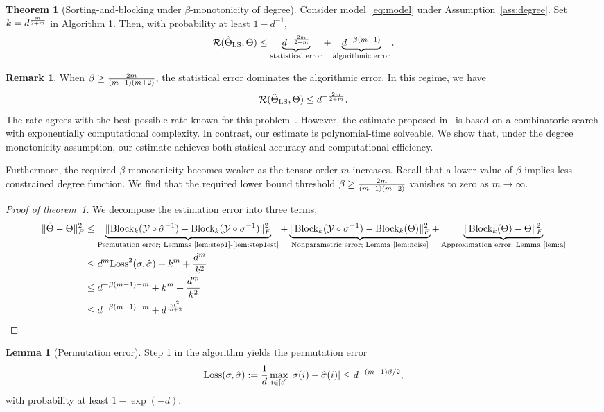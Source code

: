 \documentclass[10pt]{article}
\newcommand*{\KeepStyleUnderBrace}[1]{%
  \mathop{%
    \mathchoice
    {\underbrace{\displaystyle#1}}%
    {\underbrace{\textstyle#1}}%
    {\underbrace{\scriptstyle#1}}%
    {\underbrace{\scriptscriptstyle#1}}%
  }\limits
}
\theoremstyle{definition}
\newtheorem{thm}{Theorem}[section]
\newtheorem{lem}{Lemma}
\theoremstyle{definition}
\newtheorem{rmk}{Remark}
\theoremstyle{definition}
\begin{document}
\begin{thm}[Sorting-and-blocking under $\beta$-monotonicity of degree]\label{thm:main}
Consider model~\ref{eq:model} under Assumption~\ref{ass:degree}. Set $k=d^{m\over 2+m}$ in Algorithm 1. Then, with probability at least $1-d^{-1}$, 
\[
\tR(\hat \Theta_{\text{LS}}, \Theta) \leq \KeepStyleUnderBrace{d^{-{2m\over 2+m}}}_{\text{statistical error}}+\KeepStyleUnderBrace{d^{-{\beta(m-1)}}}_{\text{algorithmic error}}. 
\]
\end{thm}

\begin{rmk}
When $\beta\geq {2m\over (m-1)(m+2)}$, the statistical error dominates the algorithmic error.  In this regime, we have 
\[
\mathcal{R}(\hat \Theta_{\text{LS}}, \Theta) \leq d^{-{2m\over 2+m}}.
\]
The rate agrees with the best possible rate known for this problem~\cite{balasubramanian2021nonparametric}. However, the estimate proposed in~\cite{balasubramanian2021nonparametric} is based on a combinatoric search with exponentially computational complexity. In contrast, our estimate is polynomial-time solveable. We show that, under the degree monotonicity assumption, our estimate achieves both statical accuracy and computational efficiency. 

Furthermore, the required $\beta$-monotonicity becomes weaker as the tensor order $m$ increases. Recall that a lower value of $\beta$ implies less constrained degree function. We find that the required lower bound threshold $\beta\geq {2m\over (m-1)(m+2)}$ vanishes to zero as $m\to \infty$. 
\end{rmk}

\begin{proof}[Proof of theorem~\ref{thm:main}] 
We decompose the estimation error into three terms, 
\begin{align}
\FnormSize{}{\hat \Theta -\Theta}^2&\leq \KeepStyleUnderBrace{\FnormSize{}{\text{Block}_k(\tY\circ \hat \sigma^{-1}) - \text{Block}_k(\tY\circ \sigma^{-1})}^2}_{\text{Permutation error; Lemmas~\ref{lem:step1}-\ref{lem:step1est}}}+\KeepStyleUnderBrace{\FnormSize{}{\text{Block}_k(\tY\circ \sigma^{-1})-\text{Block}_k(\Theta)}^2}_{\text{Nonparametric error; Lemma~\ref{lem:noise}}}+\KeepStyleUnderBrace{\FnormSize{}{\text{Block}_k(\Theta)-\Theta}^2}_{\text{Approximation error; Lemma~\ref{lem:a}}}\\
&\leq  d^m \text{Loss}^2(\sigma,\hat \sigma) + k^m+{d^m\over k^2}\\
&\leq d^{-\beta(m-1)+m}+ k^m+ {d^m\over k^2}\\
&\leq d^{-\beta(m-1)+m}+d^{m^2\over m+2}
\end{align}
\end{proof}
\begin{lem}[Permutation error]\label{lem:step1}Step 1 in the algorithm yields the permutation error
\[
\text{Loss}(\sigma, \hat \sigma):={1\over d}\max_{i\in[d]}|\sigma(i)-  \hat \sigma(i)|\leq d^{-(m-1)\beta/2},
\]
with probability at least $1-\exp(-d)$. 
\end{lem}
\end{document}
